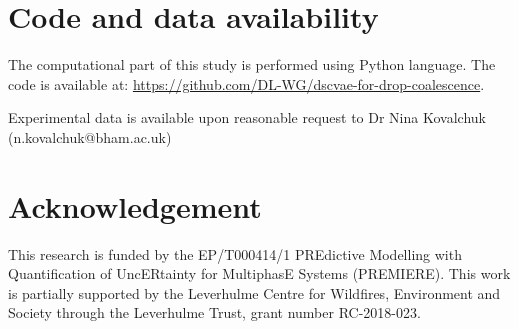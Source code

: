 \documentclass[twoside,twocolumn,9pt]{article}
\renewcommand{\refname}{Notes and references}
\begin{document}
\section*{Code and data availability}

The computational part of this study is performed using Python language. The code is available at: \url{https://github.com/DL-WG/dscvae-for-drop-coalescence}.

Experimental data is available upon reasonable request to Dr Nina Kovalchuk (n.kovalchuk@bham.ac.uk)

\section*{Acknowledgement}\label{Acknowledgement}

This research is funded by the EP/T000414/1 PREdictive Modelling with
Quantification of UncERtainty for MultiphasE Systems (PREMIERE). This work is partially supported by the Leverhulme Centre for Wildfires, Environment and Society through the Leverhulme Trust, grant number RC-2018-023.

\printglossary[type=\acronymtype, nonumberlist]



\balance

\renewcommand\refname{References}


\end{document}
